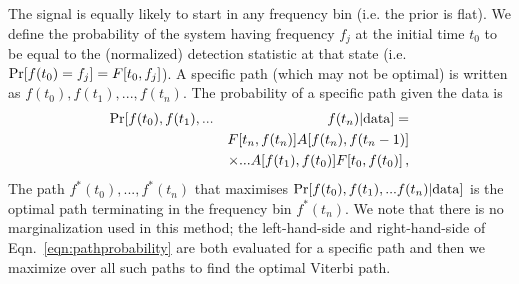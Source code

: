 \documentclass[paper-main.tex]{subfiles}
\begin{document}
The signal is equally likely to start in any frequency bin (i.e. the prior is flat). 
We define the probability of the system having frequency $f_j$ at the initial time $t_0$ to be equal to the (normalized) detection statistic at that state (i.e.\  ${\rm Pr}[f(t_0) = f_j] = F[t_0,f_j]$).
A specific path (which may not be optimal) is written as $f(t_0), f(t_1),..., f(t_n)$. 
The probability of a specific path given the data is 
\begin{eqnarray}
{\rm Pr}[ f(t_0), f(t_1),... && f(t_n) | {\rm data}] = \nonumber\\
          && F[t_n,f(t_n)] A[f(t_n),f(t_n-1)] \nonumber \\
          && \times... A[f(t_1),f(t_0)] F[t_0,f(t_0)] \,,
\label{eqn:pathprobability}
\end{eqnarray}
The path $f^\ast(t_0),...,f^\ast(t_n)$ that maximises ${\rm Pr}[ f(t_0), f(t_1),... f(t_n) | {\rm data}]$ is the optimal path terminating in the frequency bin $f^\ast(t_n)$. 
We note that there is no marginalization  used in this method; the left-hand-side and right-hand-side of Eqn.~\ref{eqn:pathprobability} are both evaluated for a specific path and then we maximize over all such paths to find the optimal Viterbi path. 
\end{document}
